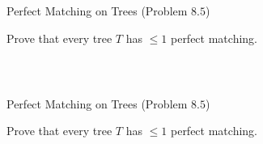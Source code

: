 \begin{frame}{}
  \begin{exampleblock}{Perfect Matching on Trees (Problem $8.5$)}
    \begin{center}
      Prove that every tree $T$ has $\le 1$ perfect matching.
    \end{center}
  \end{exampleblock}

  \pause
  \begin{center}
     \\[6pt] \pause
  \end{center}

  \pause
  \begin{columns}
      
  \end{columns}
\end{frame}

\begin{frame}{}
  \begin{exampleblock}{Perfect Matching on Trees (Problem $8.5$)}
    \begin{center}
      Prove that every tree $T$ has $\le 1$ perfect matching.
    \end{center}
  \end{exampleblock}

  \begin{center}
     \\[6pt]
  \end{center}

  \pause
  
\end{frame}


